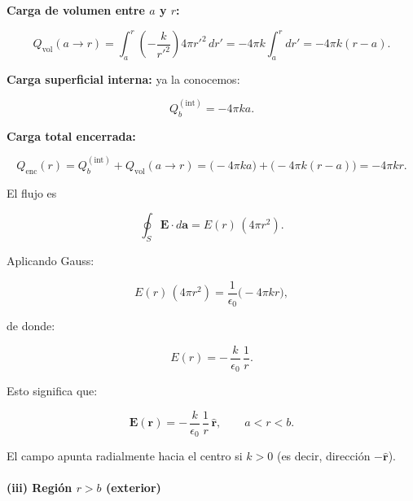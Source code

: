 \documentclass{article}
\begin{document}
\medskip

\textbf{Carga de volumen entre $a$ y $r$:}

\begin{equation}
Q_{\text{vol}}(a\to r)
= \int_{a}^{r} \left(-\frac{k}{r'^{2}}\right)4\pi r'^{2}\,dr'
= -4\pi k\int_{a}^{r}dr'
= -4\pi k(r-a).
\label{eq:Qvol-a-r}
\end{equation}

\textbf{Carga superficial interna:} ya la conocemos:

\begin{equation}
Q_{b}^{(\text{int})} = -4\pi k a.
\label{eq:Q-int-record}
\end{equation}

\textbf{Carga total encerrada:}

\begin{equation}
Q_{\text{enc}}(r)
= Q_{b}^{(\text{int})} + Q_{\text{vol}}(a\to r)
= \bigl(-4\pi k a\bigr) + \bigl(-4\pi k(r-a)\bigr)
= -4\pi k r.
\label{eq:Qenc-a-r-b}
\end{equation}

El flujo es

\begin{equation}
\oint_{S} \mathbf{E}\cdot d\mathbf{a}
= E(r)\,(4\pi r^{2}).
\label{eq:flujo-a-r-b}
\end{equation}

Aplicando Gauss:

\begin{equation}
E(r)\,(4\pi r^{2})
= \frac{1}{\epsilon_{0}}\bigl(-4\pi k r\bigr),
\label{eq:gauss-a-r-b}
\end{equation}

de donde:

\begin{equation}
E(r) = -\,\frac{k}{\epsilon_{0}}\,\frac{1}{r}.
\label{eq:E-magn-a-r-b}
\end{equation}

Esto significa que:

\begin{equation}
\boxed{
\mathbf{E}(\mathbf{r})
= -\,\frac{k}{\epsilon_{0}}\,\frac{1}{r}\,\hat{\mathbf{r}},
\qquad a<r<b.
}
\label{eq:E-vector-a-r-b}
\end{equation}

El campo apunta radialmente hacia el centro si $k>0$ (es decir, dirección
$-\hat{\mathbf{r}}$).

\paragraph{(iii) Región $r>b$ (exterior)}
\end{document}
